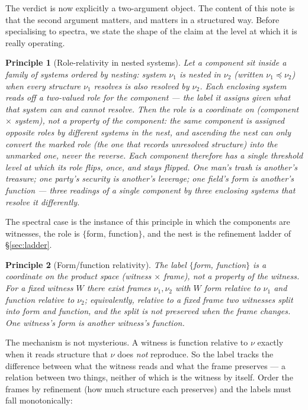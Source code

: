 \documentclass[11pt]{article}
\theoremstyle{definition}
\theoremstyle{plain}
\newtheorem{principle}{Principle}
\begin{document}
The verdict is now explicitly a two-argument object. The content of this note is that the second argument matters, and matters in a structured way. Before specialising to spectra, we state the shape of the claim at the level at which it is really operating.

\begin{principle}[Role-relativity in nested systems]\label{prin:nested}
Let a component sit inside a family of systems ordered by \emph{nesting}: system $\nu_1$ is nested in $\nu_2$ (written $\nu_1\preceq\nu_2$) when every structure $\nu_1$ resolves is also resolved by $\nu_2$. Each enclosing system reads off a two-valued \emph{role} for the component --- the label it assigns given what that system can and cannot resolve. Then the role is a coordinate on (component $\times$ system), not a property of the component: the same component is assigned opposite roles by different systems in the nest, and ascending the nest can only convert the \emph{marked} role (the one that records unresolved structure) into the \emph{unmarked} one, never the reverse. Each component therefore has a single threshold level at which its role flips, once, and stays flipped. \emph{One man's trash is another's treasure; one party's security is another's leverage; one field's form is another's function} --- three readings of a single component by three enclosing systems that resolve it differently.
\end{principle}

The spectral case is the instance of this principle in which the components are witnesses, the role is $\{$form, function$\}$, and the nest is the refinement ladder of \S\ref{sec:ladder}.

\begin{principle}[Form/function relativity]\label{prin:rel}
The label $\{$form, function$\}$ is a coordinate on the product space (witness $\times$ frame), not a property of the witness. For a fixed witness $W$ there exist frames $\nu_1,\nu_2$ with $W$ \emph{form} relative to $\nu_1$ and \emph{function} relative to $\nu_2$; equivalently, relative to a fixed frame two witnesses split into form and function, and the split is not preserved when the frame changes. \emph{One witness's form is another witness's function.}
\end{principle}

The mechanism is not mysterious. A witness is function relative to $\nu$ exactly when it reads structure that $\nu$ does \emph{not} reproduce. So the label tracks the difference between what the witness reads and what the frame preserves --- a relation between two things, neither of which is the witness by itself. Order the frames by refinement (how much structure each preserves) and the labels must fall monotonically:
\end{document}
